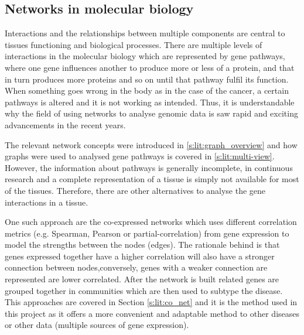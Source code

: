 \subsection{Networks in molecular biology} \label{s:lit:nets_bio}

\vspace{3mm}
\vspace{3mm}

Interactions and the relationships between multiple components are central to tissues functioning and biological processes. There are multiple levels of interactions in the molecular biology which are represented by gene pathways, where one gene influences another to produce more or less of a protein, and that in turn produces more proteins and so on until that pathway fulfil its function. When something goes wrong in the body as in the case of the cancer, a certain pathways is altered and it is not working as intended. Thus, it is understandable why the field of using networks to analyse genomic data is saw rapid and exciting advancements in the recent years. 

The relevant network concepts were introduced in \cref{s:lit:graph_overview}
and how graphs were used to analysed gene pathways is covered in \cref{s:lit:multi-view}. However, the information about pathways is generally incomplete, in continuous research and a complete representation of a tissue is simply not available for most of the tissues. Therefore, there are other alternatives to analyse the gene interactions in a tissue.

One such approach are the co-expressed networks which uses different correlation metrics (e.g. Spearman, Pearson or partial-correlation) from gene expression to model the strengths between the nodes (edges). The rationale behind is that genes expressed together have a higher correlation will also have a stronger connection between nodes,conversely, genes with a weaker connection are represented are lower correlated. After the network is built related genes are grouped together in communities which are then used to subtype the disease. This approaches are covered in Section \ref{s:lit:co_net} and it is the method used in this project as it offers a more convenient and adaptable method to other diseases or other data (multiple sources of gene expression).

